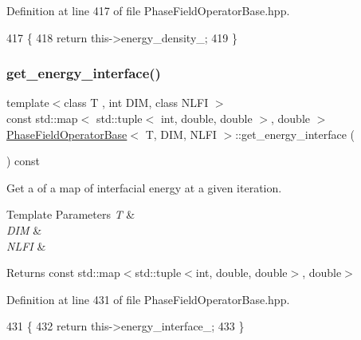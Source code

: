 Definition at line 417 of file Phase\+Field\+Operator\+Base.\+hpp.


\begin{DoxyCode}
417                                                                \{
418   \textcolor{keywordflow}{return} this->energy\_density\_;
419 \}
\end{DoxyCode}
\mbox{\label{classPhaseFieldOperatorBase_ac194823660f85a12d8edcf4520bbc025}} 
\subsubsection{\texorpdfstring{get\+\_\+energy\+\_\+interface()}{get\_energy\_interface()}}
{\footnotesize\ttfamily template$<$class T , int D\+IM, class N\+L\+FI $>$ \\
const std\+::map$<$ std\+::tuple$<$ int, double, double $>$, double $>$ \hyperlink{classPhaseFieldOperatorBase}{Phase\+Field\+Operator\+Base}$<$ T, D\+IM, N\+L\+FI $>$\+::get\+\_\+energy\+\_\+interface (\begin{DoxyParamCaption}{ }\end{DoxyParamCaption}) const\hspace{0.3cm}{\ttfamily [inherited]}}



Get a of a map of interfacial energy at a given iteration. 


\begin{DoxyTemplParams}{Template Parameters}
{\em T} & \\
\hline
{\em D\+IM} & \\
\hline
{\em N\+L\+FI} & \\
\hline
\end{DoxyTemplParams}
\begin{DoxyReturn}{Returns}
const std\+::map$<$std\+::tuple$<$int, double, double$>$, double$>$ 
\end{DoxyReturn}


Definition at line 431 of file Phase\+Field\+Operator\+Base.\+hpp.


\begin{DoxyCode}
431                                                                  \{
432   \textcolor{keywordflow}{return} this->energy\_interface\_;
433 \}
\end{DoxyCode}
\mbox{\label{classPhaseFieldOperatorBase_adc993d94274e82bc06f9555fbecbd310}} 
